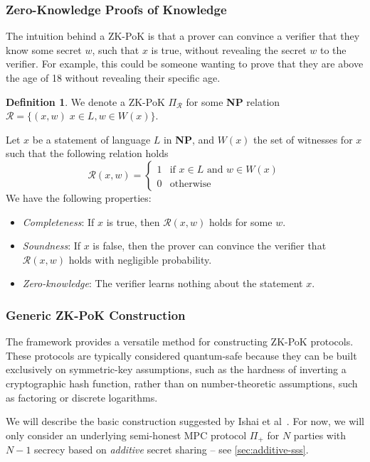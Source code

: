 \documentclass[11pt]{report}
\theoremstyle{definition}
\newtheorem{definition}{Definition}[section]
\theoremstyle{plain}
\begin{document}
\subsubsection{Zero-Knowledge Proofs of Knowledge}\label{sec:zk}
The intuition behind a ZK-PoK is that a prover can convince a verifier that they know some secret $w$, such that $x$ is true, without revealing the secret $w$ to the verifier. For example, this could be someone wanting to prove that they are above the age of 18 without revealing their specific age.

\begin{definition}
  We denote a ZK-PoK $\Pi_{\mathcal{R}}$ for some \textbf{NP} relation $\mathcal{R} = \{(x, w)\; x \in L, w \in W(x)\}$.

  Let $x$ be a statement of language $L$ in \textbf{NP}, and $W(x)$ the set of witnesses for $x$ such that the following relation holds~\cite{feneuil2023threshold}   \[
    \mathcal{R}(x,w) = \begin{cases}
      1 & \text{if } x \in L \text{ and } w \in W(x) \\
      0 & \text{otherwise}
    \end{cases}
  \]  We have the following properties:
  \begin{itemize}
    \item \textit{Completeness}: If $x$ is true, then $\mathcal{R}(x, w)$ holds for some $w$.
    \item \textit{Soundness}: If $x$ is false, then the prover can convince the verifier that $\mathcal{R}(x, w)$ holds with negligible probability.
    \item \textit{Zero-knowledge}: The verifier learns nothing about the statement $x$.
  \end{itemize}
\end{definition}

\subsubsection{Generic ZK-PoK Construction}\label{sec:zk-generic}

The framework provides a versatile method for constructing ZK-PoK protocols. These protocols are typically considered quantum-safe because they can be built exclusively on symmetric-key assumptions, such as the hardness of inverting a cryptographic hash function, rather than on number-theoretic assumptions, such as factoring or discrete logarithms.

We will describe the basic construction suggested by Ishai et al~\cite{ishai2007zero}. For now, we will only consider an underlying semi-honest MPC protocol $\Pi_+$ for $N$ parties with $N-1$ secrecy based on \textit{additive} secret sharing -- see \autoref{sec:additive-sss}.
\end{document}
